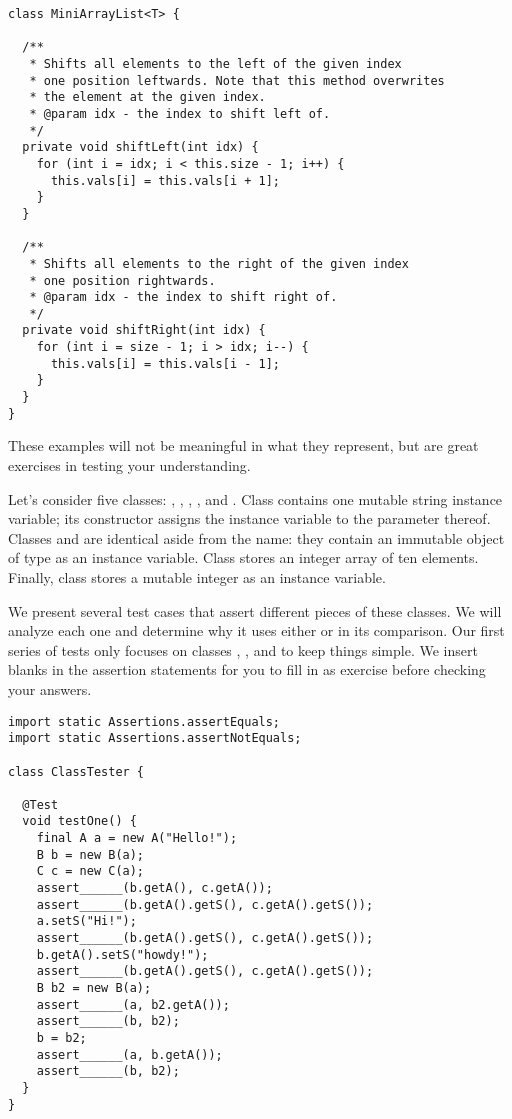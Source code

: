 \begin{lstlisting}[language=MyJava]
class MiniArrayList<T> {

  /**
   * Shifts all elements to the left of the given index 
   * one position leftwards. Note that this method overwrites 
   * the element at the given index.
   * @param idx - the index to shift left of.
   */
  private void shiftLeft(int idx) {
    for (int i = idx; i < this.size - 1; i++) { 
      this.vals[i] = this.vals[i + 1]; 
    }
  }

  /**
   * Shifts all elements to the right of the given index 
   * one position rightwards.
   * @param idx - the index to shift right of.
   */
  private void shiftRight(int idx) {
    for (int i = size - 1; i > idx; i--) { 
      this.vals[i] = this.vals[i - 1]; 
    }
  }
}
\end{lstlisting}

These examples will not be meaningful in what they represent, but are great exercises in testing your understanding. 

Let's consider five classes: , , , , and . 
Class  contains one mutable string instance variable; its constructor assigns the instance variable to the parameter thereof. 
Classes  and  are identical aside from the name: they contain an immutable object of type  as an instance variable. 
Class  stores an integer array of ten elements. 
Finally, class  stores a mutable integer as an instance variable.

We present several test cases that assert different pieces of these classes. 
We will analyze each one and determine why it uses either  or  in its comparison. 
Our first series of tests only focuses on classes , , and  to keep things simple. 
We insert blanks in the assertion statements for you to fill in as exercise before checking your answers.

\begin{lstlisting}[language=MyJava]
import static Assertions.assertEquals;
import static Assertions.assertNotEquals;

class ClassTester {

  @Test
  void testOne() {
    final A a = new A("Hello!");
    B b = new B(a);
    C c = new C(a);
    assert______(b.getA(), c.getA());
    assert______(b.getA().getS(), c.getA().getS());
    a.setS("Hi!");
    assert______(b.getA().getS(), c.getA().getS());
    b.getA().setS("howdy!");
    assert______(b.getA().getS(), c.getA().getS());
    B b2 = new B(a);
    assert______(a, b2.getA());
    assert______(b, b2);
    b = b2;
    assert______(a, b.getA());
    assert______(b, b2);
  }
}
\end{lstlisting}

